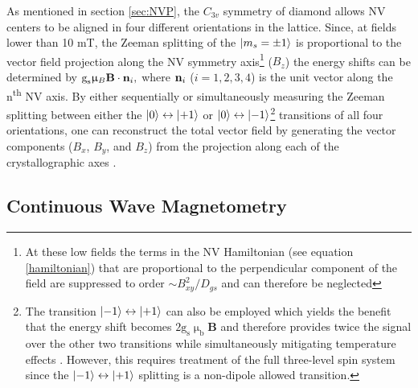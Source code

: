 As mentioned in section \ref{sec:NVP}, the $C_{3v}$ symmetry of diamond allows NV centers to be aligned in four different orientations in the lattice. Since, at fields lower than 10 mT, the Zeeman splitting of the $\ket{m_s=\pm 1}$ is proportional to the vector field projection along the NV symmetry axis\footnote{At these low fields the terms in the NV Hamiltonian (see equation \ref{hamiltonian}) that are proportional to the perpendicular component of the field are suppressed to order $\sim B_{xy}^2 / D_{gs}$ and can therefore be neglected\cite{taylor2008high}} ($B_z$) the energy shifts can be determined by $\text{g}_\text{s} \upmu_B \textbf{B} \cdot \textbf{\text{n}}_i,$ where $\textbf{\text{n}}_i$ ($i = 1,2,3,4$) is the unit vector along the n\textsuperscript{th} NV axis. By either sequentially \cite{clevenson2018Robust} or simultaneously \cite{schloss2018simultaneous, kitazawa2017vector} measuring the Zeeman splitting between either the $\ket{0} \leftrightarrow \ket{+1}$ or $\ket{0} \leftrightarrow \ket{-1}$\footnote{The transition $\ket{-1} \leftrightarrow \ket{+1}$ can also be employed which yields the benefit that the energy shift becomes $2\text{g}_\text{s}\upmu_\text{b}\textbf{B}$ and therefore provides twice the signal over the other two transitions while simultaneously mitigating temperature effects \cite{neumann2013high}. However, this requires treatment of the full three-level spin system since the $\ket{-1} \leftrightarrow \ket{+1}$ splitting is a non-dipole allowed transition.} transitions of all four orientations, one can reconstruct the total vector field by generating the vector components ($B_x$, $B_y$, and $B_z$) from the projection along each of the crystallographic axes \cite{kitazawa2017vector,schloss2018simultaneous}.

\subsection{Continuous Wave Magnetometry}

